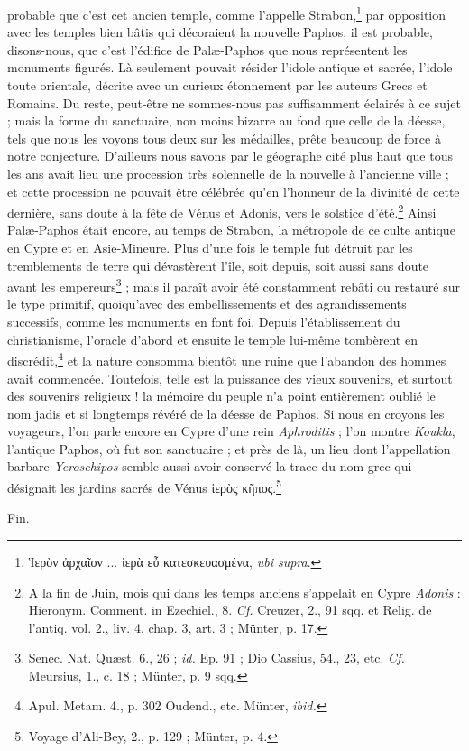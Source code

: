 \documentclass[a4paper, 11pt, oneside, polutonikogreek, french]{article}
\begin{document}
probable que c'est cet ancien temple, comme l'appelle Strabon,\footnote{Ἱερὸν ἀρχαῖον ... ἱερὰ εὖ κατεσκευασμένα, \emph{ubi supra}.} par opposition avec les temples bien bâtis qui décoraient la nouvelle Paphos, il est probable, disons-nous, que c'est l'édifice de Palæ-Paphos que nous représentent les monuments figurés. Là seulement pouvait résider l'idole antique et sacrée, l'idole toute orientale, décrite avec un curieux étonnement par les auteurs Grecs et Romains. Du reste, peut-être ne sommes-nous pas suffisamment éclairés à ce sujet ; mais la forme du sanctuaire, non moins bizarre au fond que celle de la déesse, tels que nous les voyons tous deux sur les médailles, prête beaucoup de force à notre conjecture. D'ailleurs nous savons par le géographe cité plus haut que tous les ans avait lieu une procession très solennelle de la nouvelle à l'ancienne ville ; et cette procession ne pouvait être célébrée qu'en l'honneur de la divinité de cette dernière, sans doute à la fête de Vénus et Adonis, vers le solstice d'été.\footnote{A la fin de Juin, mois qui dans les temps anciens s'appelait en Cypre \emph{Adonis} : Hieronym. Comment. in Ezechiel., 8. \emph{Cf.} Creuzer, 2., 91 sqq. et Relig. de l'antiq. vol. 2., liv. 4, chap. 3, art. 3 ; Münter, p. 17.} Ainsi Palæ-Paphos était encore, au temps de Strabon, la métropole de ce culte antique en Cypre et en Asie-Mineure. Plus d'une fois le temple fut détruit par les tremblements de terre qui dévastèrent l'île, soit depuis, soit aussi sans doute avant les empereurs\footnote{Senec. Nat. Quæst. 6., 26 ; \emph{id.} Ep. 91 ; Dio Cassius, 54., 23, etc. \emph{Cf.} Meursius, 1., c. 18 ; Münter, p. 9 sqq.} ; mais il paraît avoir été constamment rebâti ou restauré sur le type primitif, quoiqu'avec des embellissements et des agrandissements successifs, comme les monuments en font foi. Depuis l'établissement du christianisme, l'oracle d'abord et ensuite le temple lui-même tombèrent en discrédit,\footnote{Apul. Metam. 4., p. 302 Oudend., etc. Münter, \emph{ibid.}} et la nature consomma bientôt une ruine que l'abandon des hommes avait commencée. Toutefois, telle est la puissance des vieux souvenirs, et surtout des souvenirs religieux ! la mémoire du peuple n'a point entièrement oublié le nom jadis et si longtemps révéré de la déesse de Paphos. Si nous en croyons les voyageurs, l'on parle encore en Cypre d'une rein \emph{Aphroditis} ; l'on montre \emph{Koukla}, l'antique Paphos, où fut son sanctuaire ; et près de là, un lieu dont l'appellation barbare \emph{Yeroschipos} semble aussi avoir conservé la trace du nom grec qui désignait les jardins sacrés de Vénus ἱερὸς κῆπος.\footnote{Voyage d'Ali-Bey, 2., p. 129 ; Münter, p. 4.}
\begin{center}
Fin.
\end{center}
\clearpage
\end{document}
